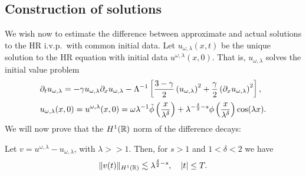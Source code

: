 \subsection{Construction of  solutions}
We wish now to estimate the difference between approximate and actual 
solutions to
the HR i.v.p.\ with common initial data. Let
$u_{\omega,\lambda}(x,t)$ be the unique solution to the HR equation
with initial data $u^{\omega,\lambda}(x,0)$. That is,
$u_{\omega,\lambda}$ solves the initial value problem
\begin{align}
& \partial_t u_{\omega,\lambda} = - \gamma u_{\omega,\lambda} \partial_x 
u_{\omega,\lambda} - \Lambda^{-1} \left[
\frac{3- \gamma}{2}\left( u_{\omega,\lambda} \right)^2 + 
\frac{\gamma}{2}\left(
\partial_x u_{\omega,\lambda} \right)^2
\right], \label{apple50}
\\
& u_{\omega,\lambda}(x, 0) = u^{\omega,\lambda}(x,0) = \omega \lambda^{-1}
\tilde{\phi} \left( \frac{x}{\lambda^\delta} \right)
+ \lambda^{-\frac{\delta}{2} -s}
\phi\left( \frac{x}{\lambda^\delta} \right) \cos(\lambda x).
\label{apple41}
\end{align}
%
%
%
We will now prove that the $H^1(\mathbb{R})$ norm of the difference decays: 
%
%
%
%
%
%
%
%
%
%
%
%
%
%
%
\begin{proposition}
\label{applelem:bound_for_difference-of-approx-and-actual-soln}
%
Let $v = u^{\omega,\lambda} - u_{\omega,\lambda}$, with $\lambda >>1$.
Then, for $s > 1$ and $1<\delta<2$ we have
%
%
\begin{equation} \|
v(t)
\|_{H^1(\mathbb{R})}
\lesssim \lambda^{\frac{\delta}{2} -s}, \quad
|t| \le T.
\end{equation}
%
%
\end{proposition}
%
%
